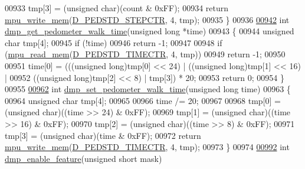 \begin{DoxyCode}
00933     tmp[3] = (\textcolor{keywordtype}{unsigned} char)(count & 0xFF);
00934     \textcolor{keywordflow}{return} \hyperlink{group___d_r_i_v_e_r_s_gafea59910bc3dd30ba3356b1c75213a5f}{mpu\_write\_mem}(\hyperlink{group___d_r_i_v_e_r_s_ga4925c8f2bfe6e2698c10bf5b1094dc54}{D\_PEDSTD\_STEPCTR}, 4, tmp);
00935 \}
00936 
\hypertarget{inv__mpu__dmp__motion__driver_8c_source.tex_l00942}{}\hyperlink{group___d_r_i_v_e_r_s_ga62c8e5e99986b0e60ca0dc9a9b9c3fcc}{00942} \textcolor{keywordtype}{int} \hyperlink{group___d_r_i_v_e_r_s_ga62c8e5e99986b0e60ca0dc9a9b9c3fcc}{dmp\_get\_pedometer\_walk\_time}(\textcolor{keywordtype}{unsigned} \textcolor{keywordtype}{long} *time)
00943 \{
00944     \textcolor{keywordtype}{unsigned} \textcolor{keywordtype}{char} tmp[4];
00945     \textcolor{keywordflow}{if} (!time)
00946         \textcolor{keywordflow}{return} -1;
00947 
00948     \textcolor{keywordflow}{if} (\hyperlink{group___d_r_i_v_e_r_s_ga3374bececb6743893c9eab27645c1182}{mpu\_read\_mem}(\hyperlink{group___d_r_i_v_e_r_s_gaee461dfb8a3fcd18ea6dddeaba63457b}{D\_PEDSTD\_TIMECTR}, 4, tmp))
00949         \textcolor{keywordflow}{return} -1;
00950 
00951     time[0] = (((\textcolor{keywordtype}{unsigned} long)tmp[0] << 24) | ((\textcolor{keywordtype}{unsigned} long)tmp[1] << 16) |
00952         ((\textcolor{keywordtype}{unsigned} long)tmp[2] << 8) | tmp[3]) * 20;
00953     \textcolor{keywordflow}{return} 0;
00954 \}
00955 
\hypertarget{inv__mpu__dmp__motion__driver_8c_source.tex_l00962}{}\hyperlink{group___d_r_i_v_e_r_s_ga62f469269047f8cba16a2b7f5349acc0}{00962} \textcolor{keywordtype}{int} \hyperlink{group___d_r_i_v_e_r_s_ga62f469269047f8cba16a2b7f5349acc0}{dmp\_set\_pedometer\_walk\_time}(\textcolor{keywordtype}{unsigned} \textcolor{keywordtype}{long} time)
00963 \{
00964     \textcolor{keywordtype}{unsigned} \textcolor{keywordtype}{char} tmp[4];
00965 
00966     time /= 20;
00967 
00968     tmp[0] = (\textcolor{keywordtype}{unsigned} char)((time >> 24) & 0xFF);
00969     tmp[1] = (\textcolor{keywordtype}{unsigned} char)((time >> 16) & 0xFF);
00970     tmp[2] = (\textcolor{keywordtype}{unsigned} char)((time >> 8) & 0xFF);
00971     tmp[3] = (\textcolor{keywordtype}{unsigned} char)(time & 0xFF);
00972     \textcolor{keywordflow}{return} \hyperlink{group___d_r_i_v_e_r_s_gafea59910bc3dd30ba3356b1c75213a5f}{mpu\_write\_mem}(\hyperlink{group___d_r_i_v_e_r_s_gaee461dfb8a3fcd18ea6dddeaba63457b}{D\_PEDSTD\_TIMECTR}, 4, tmp);
00973 \}
00974 
\hypertarget{inv__mpu__dmp__motion__driver_8c_source.tex_l00992}{}\hyperlink{group___d_r_i_v_e_r_s_ga70c485bdfa30515e5b869b081192caa1}{00992} \textcolor{keywordtype}{int} \hyperlink{group___d_r_i_v_e_r_s_ga70c485bdfa30515e5b869b081192caa1}{dmp\_enable\_feature}(\textcolor{keywordtype}{unsigned} \textcolor{keywordtype}{short} mask)

\end{DoxyCode}
